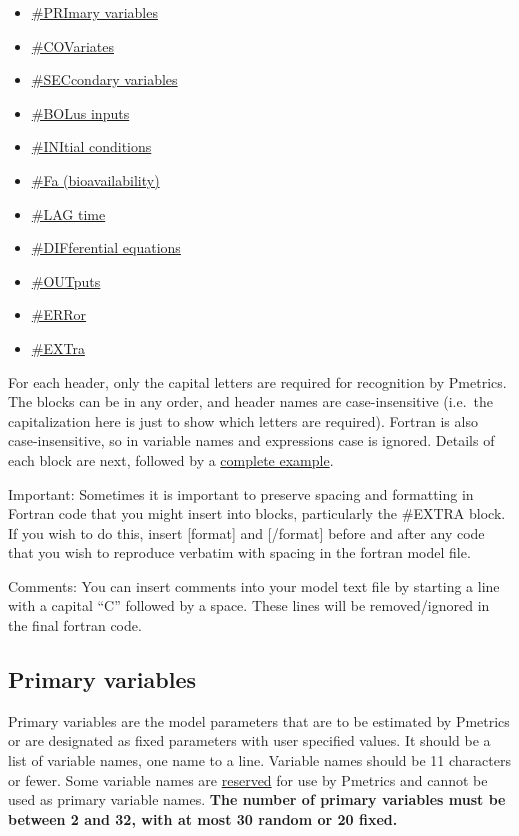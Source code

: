 \documentclass[
]{book}
\providecommand{\tightlist}{%
  \setlength{\itemsep}{0pt}\setlength{\parskip}{0pt}}
\begin{document}
\begin{itemize}
\tightlist
\item
  \protect\hyperlink{pri}{\#PRImary variables}
\item
  \protect\hyperlink{cov}{\#COVariates}
\item
  \protect\hyperlink{sec}{\#SECcondary variables}
\item
  \protect\hyperlink{bol}{\#BOLus inputs}
\item
  \protect\hyperlink{ini}{\#INItial conditions}
\item
  \protect\hyperlink{fa}{\#Fa (bioavailability)}
\item
  \protect\hyperlink{lag}{\#LAG time}
\item
  \protect\hyperlink{dif}{\#DIFferential equations}
\item
  \protect\hyperlink{out}{\#OUTputs}
\item
  \protect\hyperlink{err}{\#ERRor}
\item
  \protect\hyperlink{extra}{\#EXTra}
\end{itemize}

For each header, only the capital letters are required for recognition
by Pmetrics. The blocks can be in any order, and header names are
case-insensitive (i.e.~the capitalization here is just to show which
letters are required). Fortran is also case-insensitive, so in variable
names and expressions case is ignored. Details of each block are next,
followed by a \protect\hyperlink{completeEx}{complete example}.

Important: Sometimes it is important to preserve spacing and formatting in Fortran code that you might insert into blocks, particularly the \#EXTRA block. If you wish to do this, insert {[}format{]} and {[}/format{]} before and after any code that you wish to reproduce verbatim with spacing in the fortran model file.

Comments: You can insert comments into your model text file by starting a line with a capital ``C'' followed by a space. These lines will be removed/ignored in the final fortran code.

\hypertarget{pri}{%
\subsection{Primary variables}\label{pri}}

Primary variables are the model parameters that are to be estimated by
Pmetrics or are designated as fixed parameters with user specified
values. It should be a list of variable names, one name to a line.
Variable names should be 11 characters or fewer. Some variable names are \protect\hyperlink{reserved}{reserved} for use by Pmetrics and cannot be used as
primary variable names. \textbf{The number of primary variables must be
between 2 and 32, with at most 30 random or 20 fixed.}
\end{document}
